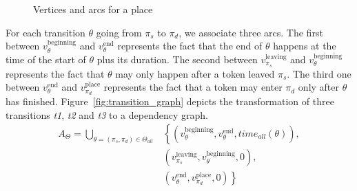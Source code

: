 \begin{figure}[h]
  \caption{Vertices and arcs for a place}
  \label{fig:place_graph}
\end{figure}

For each transition $\theta$ going from $\pi_s$ to $\pi_d$, we associate
three arcs. The first between $v_\theta^\text{beginning}$ and $v_\theta^\text{end}$
represents the fact that the end of $\theta$ happens at the time of the
start of $\theta$ plus its duration. The second between $v_{\pi_{s}}^\text{leaving}$
and $v_\theta^\text{beginning}$ represents the fact that $\theta$ may only
happen after a token leaved $\pi_s$. The third one between $v_\theta^\text{end}$ and
$v_{\pi_{d}}^\text{place}$ represents the fact that a token may enter $\pi_d$ only
after $\theta$ has finished.
Figure~\ref{fig:transition_graph} depicts the transformation of three
transitions \emph{t1}, \emph{t2} and \emph{t3} to a dependency graph.
\begin{align*}
A_{\Theta}=\bigcup_{\theta=\left(\pi_{s},\pi_{d}\right)\in\Theta_{all}} & \left\{ \left(v_\theta^\text{beginning},v_\theta^\text{end},time_{all}\left(\theta\right)\right),\right.\\
 & \left(v_{\pi_{s}}^\text{leaving},v_\theta^\text{beginning},0\right),\\
 & \left. \left(v_\theta^\text{end},v_{\pi_{d}}^\text{place},0\right)\right\}
\end{align*}

